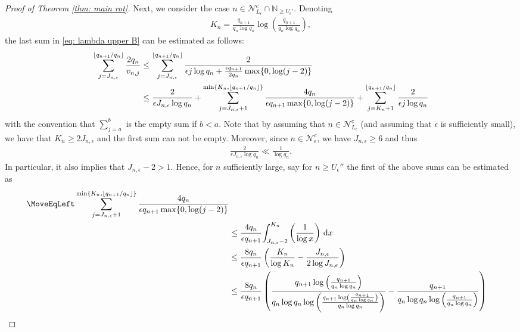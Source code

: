 \documentclass[11pt]{amsart}
\theoremstyle{definition}
\numberwithin{equation}{section}
\begin{document}
\begin{proof}[Proof of Theorem \ref{thm: main rot}]
Next, we consider the case $n\in \mathcal{N}_{L_{\epsilon}}^c\cap\mathbb{N}_{\geq U_{\epsilon}'}$.
Denoting 
\begin{align*}
 K_n=\frac{q_{n+1}}{q_n\log q_n}\log\left( \frac{q_{n+1}}{q_n\log q_n}\right),
\end{align*}
the last sum in \eqref{eq: lambda upper B} can be estimated as follows: 
\begin{align}
 \sum_{j=J_{n,\epsilon}}^{\lfloor q_{n+1}/q_n\rfloor} \frac{2q_n}{v_{n,j}}
 &\leq \sum_{j=J_{n,\epsilon}}^{\lfloor q_{n+1}/q_n\rfloor} \frac{2}{\epsilon j \log q_n+\frac{\epsilon q_{n+1}}{2 q_n}  \max\{0,\log(j-2)\}}\notag\\
 &\leq  \frac{2}{\epsilon J_{n,\epsilon} \log q_n}+\sum_{j=J_{n,\epsilon}+1}^{\min\{K_n, \lfloor q_{n+1}/q_n\rfloor\}} \frac{4 q_n}{\epsilon q_{n+1}  \max\{0,\log(j-2)\}}+\sum_{j=K_n+1}^{\lfloor q_{n+1}/q_n\rfloor}
 \frac{2}{\epsilon j \log q_n}\label{eq: lambda upper B1}
\end{align}
with the convention that $\sum_{j=a}^b$ is the empty sum if $b<a$. 
Note that by assuming that $n\in\mathcal{N}_{L_{\epsilon}}^c$ (and assuming that $\epsilon$ is sufficiently small), we have that $K_n\geq 2 J_{n,\epsilon}$ and the first sum can not be empty. 
Moreover, since $n\in\mathcal{N}_{\epsilon}^c$, we have $J_{n,\epsilon}\geq 6$ and thus 
\begin{align}
 \frac{2}{\epsilon J_{n,\epsilon} \log q_n}\ll \frac{1}{\log q_n}. \label{eq: lambda upper B1 first summand}
\end{align}
In particular, it also implies that $J_{n,\epsilon}-2>1$.
Hence, for $n$ sufficiently large, say for $n\geq U_{\epsilon}''$ the first of the above sums can be estimated as 
\begin{align*}
 \MoveEqLeft\sum_{j=J_{n,\epsilon}+1}^{\min\{K_n, \lfloor q_{n+1}/q_n\rfloor\}} \frac{4 q_n}{\epsilon q_{n+1}  \max\{0,\log(j-2)\}}\notag\\
 &\leq \frac{4 q_n}{\epsilon q_{n+1}}{\int_{J_{n,\epsilon}-2}^{K_n}\left(
 \frac{1}{\log x}\right)\,\mathrm{d}x}\notag\\
  &\leq \frac{8 q_n}{\epsilon q_{n+1}}\left( \frac{K_n}{\log K_n}- 
 \frac{J_{n,\epsilon}}{2\log J_{n,\epsilon}}\right)\notag\\
 &\leq \frac{8 q_n}{\epsilon q_{n+1}}\left( \frac{q_{n+1}\log\left( \frac{q_{n+1}}{q_n\log q_n}\right)}{q_n\log q_n \log \left( \frac{q_{n+1}\log\left( \frac{q_{n+1}}{q_n\log q_n}\right)}{q_n\log q_n }\right)}- 
 \frac{q_{n+1}}{q_n \log q_n \log \left( \frac{q_{n+1}}{q_n\log q_n}\right)}\right)\notag\\

\end{align*}
\end{proof}
\end{document}

